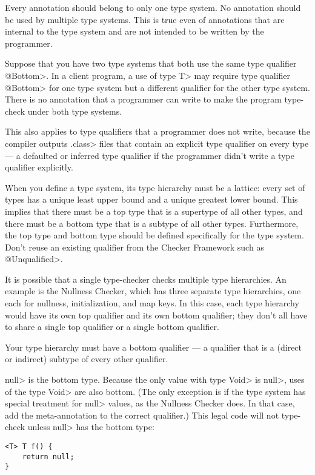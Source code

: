 
Every annotation should belong to only one type system.  No annotation
should be used by multiple type systems.  This is true even of annotations
that are internal to the type system and are not intended to be written by
the programmer.

Suppose that you have two type systems that both use the same type
qualifier \<@Bottom>.  In a client program, a use of type \<T> may require type
qualifier \<@Bottom> for one type system but a different qualifier for the other
type system.  There is no annotation that a programmer can write to make
the program type-check under both type systems.

This also applies to type qualifiers that a programmer does not write,
because the compiler outputs \<.class> files that contain an explicit type
qualifier on every type --- a defaulted or inferred type qualifier if the
programmer didn't write a type qualifier explicitly.



When you define a type system, its type hierarchy must be a
lattice:  every set of types has a unique least upper bound and a unique
greatest lower bound.  This implies that there must be a top type that is a
supertype of all other types, and there must be a bottom type that is a
subtype of all other types.
Furthermore, the top type and bottom type should be defined
specifically for the type system.  Don't reuse an existing qualifier from the
Checker Framework such as \<@Unqualified>.

It is possible that a single type-checker checks multiple type hierarchies.
An example is the Nullness Checker, which has three separate type
hierarchies, one each for
nullness, initialization, and map keys.  In this case, each type hierarchy
would have its own top qualifier and its own bottom qualifier; they don't
all have to share a single top qualifier or a single bottom qualifier.


Your type hierarchy must have a bottom qualifier
--- a qualifier that is a (direct or indirect) subtype of every other
qualifier.

\<null> is the bottom type. Because the only value with type \<Void> is
\<null>, uses of the type \<Void> are also bottom.
(The only exception
is if the type system has special treatment for \<null> values, as the
Nullness Checker does. In that case, add the meta-annotation
to the correct qualifier.)
This legal code
will not type-check unless \<null> has the bottom type:
\begin{Verbatim}
<T> T f() {
    return null;
}
\end{Verbatim}


